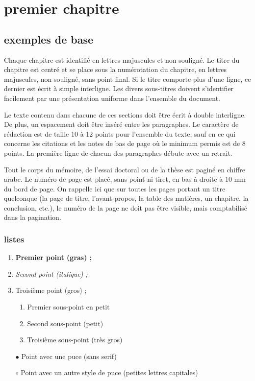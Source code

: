 \chapter{premier chapitre}
\label{chap:chap_1}

\section{exemples de base}
\label{sec:sec_examples_chap_1}

Chaque chapitre est identifié en lettres majuscules et non souligné. Le titre du chapitre est centré et se place sous la numérotation du chapitre, en lettres majuscules, non souligné, sans point final. Si le titre comporte plus d'une ligne, ce dernier est écrit à simple interligne. Les divers sous-titres doivent s'identifier facilement par une présentation uniforme dans l'ensemble du document.

Le texte contenu dans chacune de ces sections doit être écrit à double interligne. De plus, un espacement doit être inséré entre les paragraphes. Le caractère de rédaction est de taille 10 à 12 points pour l’ensemble du texte, sauf en ce qui concerne les citations et les notes de bas de page où le minimum permis est de 8 points. La première ligne de chacun des paragraphes débute avec un retrait.

Tout le corps du mémoire, de l’essai doctoral ou de la thèse est paginé en chiffre arabe. Le numéro de page est placé, sans point ni tiret, en bas à droite à 10 mm du bord de page. On rappelle ici que sur toutes les pages portant un titre quelconque (la page de titre, l'avant-propos, la table des matières, un chapitre, la conclusion, etc.), le numéro de la page ne doit pas être visible, mais comptabilisé dans la pagination.

\subsection{listes}
\label{subsec:subsec_list}

\begin{enumerate}
  \item {\bf Premier point (gras) ;}
  \item {\em Second point (italique) ;}
  \item {\Large Troisième point (gros) ;}
      \begin{enumerate}
          \item {\small Premier sous-point en petit}
          \item {\tiny Second sous-point (petit)}
          \item {\Huge Troisième sous-point (très gros)}
      \end{enumerate}
  \item[$\bullet$] {\sf Point avec une puce (sans serif)}
  \item[$\circ$] {\sc Point avec un autre style de puce (petites lettres capitales)}
\end{enumerate}


